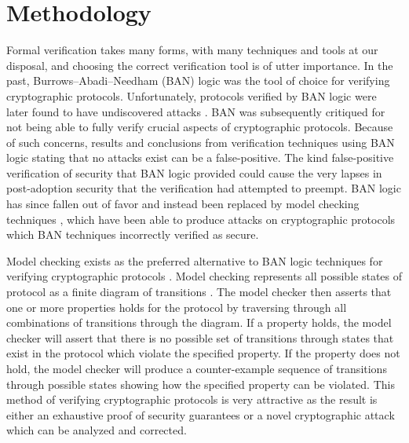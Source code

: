 \documentclass[12pt,twocolumn]{article}
\begin{document}
	
	\section*{Methodology}
	
	Formal verification takes many forms, with many techniques and tools at our disposal, and choosing the correct verification tool is of utter importance.
	In the past, Burrows–Abadi–Needham (BAN) \cite{burrows1989logic} logic was the tool of choice for verifying cryptographic protocols.
	Unfortunately, protocols verified by BAN logic were later found to have undiscovered attacks \cite{10.5555/188307.188350}.
	BAN was subsequently critiqued for not being able to fully verify crucial aspects of cryptographic protocols.
	Because of such concerns, results and conclusions from verification techniques using BAN logic stating that no attacks exist can be a false-positive.
	The kind false-positive verification of security that BAN logic provided could cause the very lapses in post-adoption security that the verification had attempted to preempt.
	BAN logic has since fallen out of favor and instead been replaced by model checking techniques \cite{marrero1997model}, which have been able to produce attacks on cryptographic protocols which BAN techniques incorrectly verified as secure.
	
	
	Model checking exists as the preferred alternative to BAN logic techniques for verifying cryptographic protocols \cite{kacprzak2006comparing} \cite{lomuscio2007verification} \cite{van2004symbolic} . Model checking represents all possible states of protocol as a finite diagram of transitions \cite{clarke1981design}. The model checker then asserts that one or more properties holds for the protocol by traversing through all combinations of transitions through the diagram. If a property holds, the model checker will assert that there is no possible set of transitions through states that exist in the protocol which violate the specified property. If the property does not hold, the model checker will produce a counter-example sequence of transitions through possible states showing how the specified property can be violated. This method of verifying cryptographic protocols is very attractive as the result is either an exhaustive proof of security guarantees or a novel cryptographic attack which can be analyzed and corrected. 
	
\end{document}
